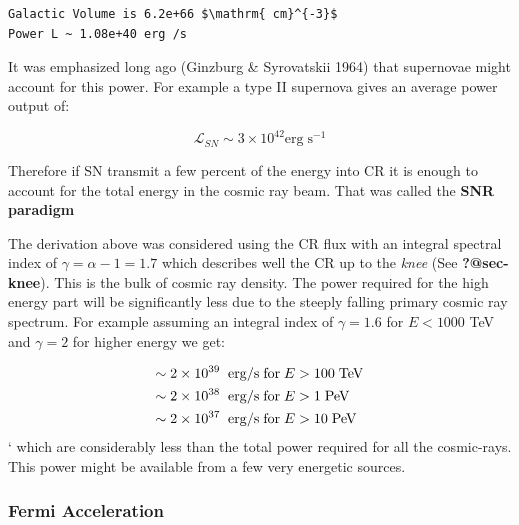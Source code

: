 \documentclass[
  letterpaper,
  DIV=11,
  numbers=noendperiod]{scrreprt}
\begin{document}
\begin{verbatim}
Galactic Volume is 6.2e+66 $\mathrm{ cm}^{-3}$
Power L ~ 1.08e+40 erg /s
\end{verbatim}

It was emphasized long ago (Ginzburg \& Syrovatskii 1964) that
supernovae might account for this power. For example a type II supernova
gives an average power output of:

\[\mathcal{L}_{SN} \sim 3 \times 10^{42} \mathrm{ erg\;s}^{-1}\]

Therefore if SN transmit a few percent of the energy into CR it is
enough to account for the total energy in the cosmic ray beam. That was
called the \textbf{SNR paradigm}

\begin{tcolorbox}[enhanced jigsaw, colframe=quarto-callout-important-color-frame, opacitybacktitle=0.6, left=2mm, leftrule=.75mm, opacityback=0, colbacktitle=quarto-callout-important-color!10!white, breakable, bottomrule=.15mm, toprule=.15mm, colback=white, coltitle=black, bottomtitle=1mm, toptitle=1mm, titlerule=0mm, title=\textcolor{quarto-callout-important-color}{\faExclamation}\hspace{0.5em}{Power Required for \textgreater{} 100 TeV}, arc=.35mm, rightrule=.15mm]

The derivation above was considered using the CR flux with an integral
spectral index of \(\gamma = \alpha -1 =  1.7\) which describes well the
CR up to the \emph{knee} (See \textbf{?@sec-knee}). This is the bulk of
cosmic ray density. The power required for the high energy part will be
significantly less due to the steeply falling primary cosmic ray
spectrum. For example assuming an integral index of \(\gamma = 1.6\) for
\(E < 1000\) TeV and \(\gamma = 2\) for higher energy we get:

\[\begin{aligned}
\sim 2 \times 10^{39} {\;\rm\;erg/s\; for\; } E &> 100 \mathrm{\; TeV}\\
\sim 2 \times 10^{38} {\;\rm\;erg/s\; for\; } E &> 1 \mathrm{\; PeV}\\
 \sim 2 \times 10^{37} {\;\rm\;erg/s\; for\; } E &> 10 \mathrm{\; PeV}
 \end{aligned}\] ` which are considerably less than the total power
required for all the cosmic-rays. This power might be available from a
few very energetic sources.

\end{tcolorbox}

\subsubsection*{Fermi Acceleration}\label{fermi-acceleration}
\end{document}
